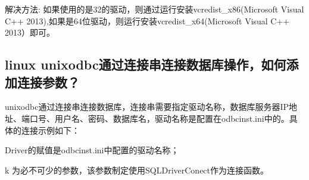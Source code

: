 \documentclass[letterpaper,10pt,english]{sphinxmanual}
\begin{document}
\begin{figure}[htbp]
\centering

\noindent{}
\end{figure}

解决方法: 如果使用的是32的驱动，则通过运行安装vcredist\_x86(Microsoft Visual C++ 2013),如果是64位驱动，则运行安装vcredist\_x64(Microsoft Visual C++ 2013）即可。


\subsection{linux unixodbc通过连接串连接数据库操作，如何添加连接参数？}
\label{\detokenize{interface/odbc:linux-unixodbc}}
unixodbc通过连接串连接数据库，连接串需要指定驱动名称，数据库服务器IP地址、端口号、用户名、密码、数据库名，驱动名称是配置在odbcinst.ini中的。具体的连接示例如下：

\begin{sphinxVerbatim}[commandchars=\\\{\}]
  
\end{sphinxVerbatim}

Driver的赋值是odbcinst.ini中配置的驱动名称；

\sphinxhyphen{}k 为必不可少的参数，该参数制定使用SQLDriverConect作为连接函数。
\end{document}
